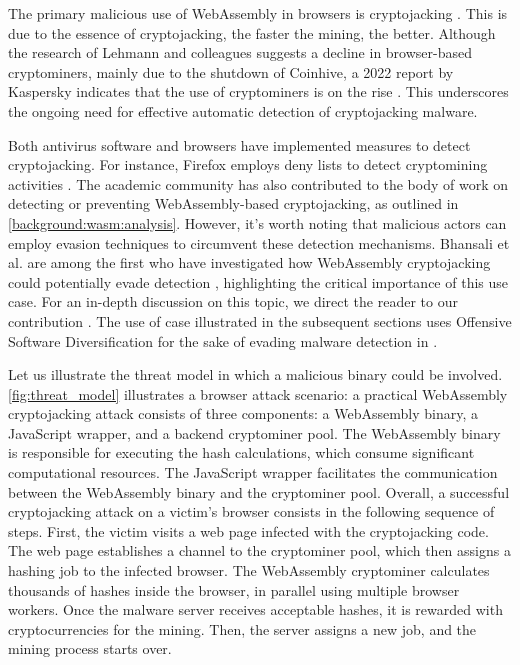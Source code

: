 
The primary malicious use of WebAssembly in browsers is cryptojacking \cite{musch2019new}. 
This is due to the essence of cryptojacking, the faster the mining, the better. 
Although the research of Lehmann and colleagues \cite{Hilbig2021AnES} suggests a decline in browser-based cryptominers, mainly due to the shutdown of Coinhive, a 2022 report by Kaspersky indicates that the use of cryptominers is on the rise \cite{kasperksy}. 
This underscores the ongoing need for effective automatic detection of cryptojacking malware.

Both antivirus software and browsers have implemented measures to detect cryptojacking. For instance, Firefox employs deny lists to detect cryptomining activities \cite{firefoxcrypto}. 
The academic community has also contributed to the body of work on detecting or preventing WebAssembly-based cryptojacking, as outlined in \autoref{background:wasm:analysis}. 
However, it's worth noting that malicious actors can employ evasion techniques to circumvent these detection mechanisms. 
Bhansali et al. are among the first who have investigated how WebAssembly cryptojacking could potentially evade detection \cite{10.1145/3507657.3528560}, highlighting the critical importance of this use case. 
For an in-depth discussion on this topic, we direct the reader to our contribution \cite{EVASION}.
The use of case illustrated in the subsequent sections uses Offensive Software Diversification for the sake of evading malware detection in \Wasm. 



Let us illustrate the threat model in which a malicious \wasm binary could be involved.
\autoref{fig:threat_model} illustrates a browser attack scenario:
a practical WebAssembly cryptojacking attack consists of three components: a WebAssembly binary, a JavaScript wrapper, and a backend cryptominer pool. 
The WebAssembly binary is responsible for executing the hash calculations, which consume significant computational resources. 
The JavaScript wrapper facilitates the communication between the WebAssembly binary and the cryptominer pool.
Overall, a successful cryptojacking attack on a victim's browser consists in the following sequence of steps. 
First, the victim visits a web page infected with the cryptojacking code. 
The web page establishes a channel to the cryptominer pool, which then assigns a hashing job to the infected browser. 
The WebAssembly cryptominer calculates thousands of hashes inside the browser, in parallel using multiple browser workers. 
Once the malware server receives acceptable hashes, it is rewarded with cryptocurrencies for the mining. 
Then, the server assigns a new job, and the mining process starts over.

